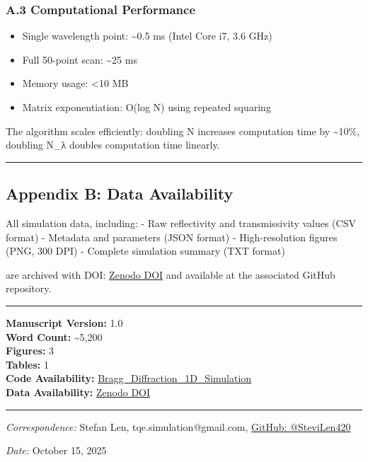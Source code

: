 \documentclass[
]{article}
\providecommand{\tightlist}{%
  \setlength{\itemsep}{0pt}\setlength{\parskip}{0pt}}
\begin{document}
\subsubsection{A.3 Computational
Performance}\label{a.3-computational-performance}

\begin{itemize}
\tightlist
\item
  Single wavelength point: \textasciitilde0.5 ms (Intel Core i7, 3.6
  GHz)
\item
  Full 50-point scan: \textasciitilde25 ms
\item
  Memory usage: \textless10 MB
\item
  Matrix exponentiation: O(log N) using repeated squaring
\end{itemize}

The algorithm scales efficiently: doubling N increases computation time
by \textasciitilde10\%, doubling N\_λ doubles computation time linearly.

\begin{center}\rule{0.5\linewidth}{0.5pt}\end{center}

\subsection{Appendix B: Data
Availability}\label{appendix-b-data-availability}

All simulation data, including: - Raw reflectivity and transmissivity
values (CSV format) - Metadata and parameters (JSON format) -
High-resolution figures (PNG, 300 DPI) - Complete simulation summary
(TXT format)

are archived with DOI:
\href{https://doi.org/10.5281/zenodo.17358243}{Zenodo DOI} and available
at the associated GitHub repository.

\begin{center}\rule{0.5\linewidth}{0.5pt}\end{center}

\textbf{Manuscript Version:} 1.0\\
\textbf{Word Count:} \textasciitilde5,200\\
\textbf{Figures:} 3\\
\textbf{Tables:} 1\\
\textbf{Code Availability:}
\href{https://github.com/SteviLen420/Bragg_Diffraction_1D_Simulation}{Bragg\_Diffraction\_1D\_Simulation}\\
\textbf{Data Availability:}
\href{https://doi.org/10.5281/zenodo.17358243}{Zenodo DOI}

\begin{center}\rule{0.5\linewidth}{0.5pt}\end{center}

\emph{Correspondence:} Stefan Len, tqe.simulation@gmail.com,
\href{https://github.com/SteviLen420/Bragg_Diffraction_1D_Simulation}{GitHub:
@SteviLen420}

\emph{Date:} October 15, 2025
\end{document}
